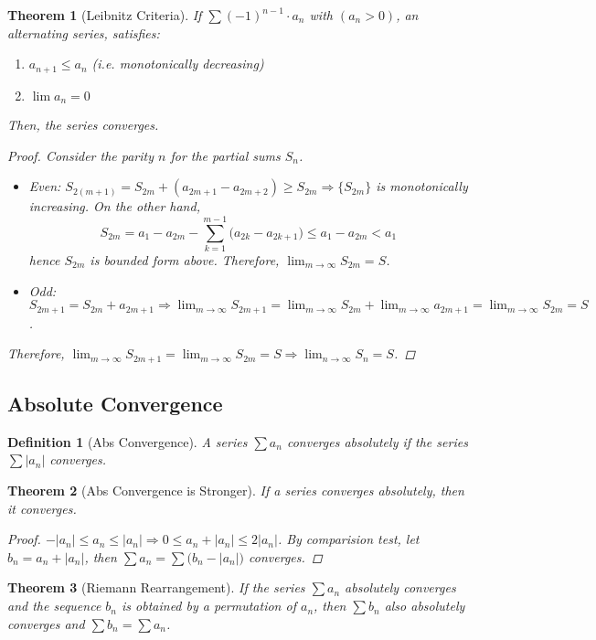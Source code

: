 \documentclass[12pt]{article}
\let\RA\Rightarrow
\newtheorem{theorem}{Theorem}[subsection]
\newtheorem{definition}{Definition}[subsection]
\begin{document}
\begin{theorem}[Leibnitz Criteria]
  If $\sum (-1)^{n-1}\cdot a_n$ with $(a_n>0)$, an alternating series, satisfies:
  \begin{enumerate}
    \item $a_{n+1}\leq a_n$ (i.e. monotonically decreasing)
    \item $\lim a_n =0$
  \end{enumerate}
  Then, the series converges.
  \begin{proof}
    Consider the parity $n$ for the partial sums $S_n$.
    \begin{itemize}
      \item Even: $S_{2(m+1)}=S_{2m}+(a_{2m+1}-a_{2m+2})\geq S_{2m}\RA \{S_{2m}\}$ is monotonically increasing. On the other hand, $$S_{2m}=a_1-a_{2m}-\sum_{k=1}^{m-1}\big(a_{2k}-a_{2k+1}\big)\leq a_1-a_{2m} < a_1$$ hence $S_{2m}$ is bounded form above. Therefore, $\lim_{m\to\infty}S_{2m}= S$.
      \item Odd: $\displaystyle S_{2m+1}=S_{2m}+a_{2m+1}\RA\lim_{m\to\infty}S_{2m+1}=\lim_{m\to\infty}S_{2m}+\lim_{m\to\infty}a_{2m+1}=\lim_{m\to\infty}S_{2m}=S$.
    \end{itemize}
    Therefore, $\lim_{m\to\infty}S_{2m+1}=\lim_{m\to\infty}S_{2m}=S\RA \lim_{n\to\infty}S_n=S$.
  \end{proof}
\end{theorem}

\pagebreak

\subsection{Absolute Convergence}

\begin{definition}[Abs Convergence]
  A series $\sum a_n$ converges absolutely if the series $\sum |a_n|$ converges.
\end{definition}

\begin{theorem}[Abs Convergence is Stronger]
  If a series converges absolutely, then it converges.
  \begin{proof}
    $-|a_n|\leq a_n\leq |a_n|\RA 0\leq a_n+|a_n|\leq 2|a_n|$. By comparision test, let $b_n=a_n+|a_n|$, then $\sum a_n = \sum \big(b_n-|a_n|\big)$ converges.
  \end{proof}
\end{theorem}

\begin{theorem}[Riemann Rearrangement]
  If the series $\sum a_n$ absolutely converges and the sequence $b_n$ is obtained by a permutation of $a_n$, then $\sum b_n$ also absolutely converges and $\sum b_n = \sum a_n$.
\end{theorem}
\end{document}
